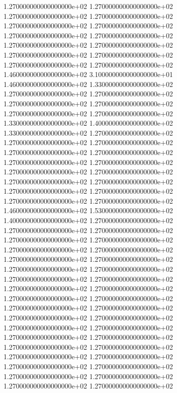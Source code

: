 1.270000000000000000e+02 1.270000000000000000e+02 1.270000000000000000e+02 1.270000000000000000e+02 1.270000000000000000e+02 1.270000000000000000e+02 1.270000000000000000e+02 1.270000000000000000e+02 1.270000000000000000e+02 1.270000000000000000e+02 1.270000000000000000e+02 1.270000000000000000e+02 1.270000000000000000e+02 1.270000000000000000e+02 1.460000000000000000e+02 3.100000000000000000e+01 1.460000000000000000e+02 1.330000000000000000e+02 1.270000000000000000e+02 1.270000000000000000e+02 1.270000000000000000e+02 1.270000000000000000e+02 1.270000000000000000e+02 1.270000000000000000e+02 1.330000000000000000e+02 1.400000000000000000e+02 1.330000000000000000e+02 1.270000000000000000e+02 1.270000000000000000e+02 1.270000000000000000e+02 1.270000000000000000e+02 1.270000000000000000e+02 1.270000000000000000e+02 1.270000000000000000e+02 1.270000000000000000e+02 1.270000000000000000e+02 1.270000000000000000e+02 1.270000000000000000e+02 1.270000000000000000e+02 1.270000000000000000e+02 1.270000000000000000e+02 1.270000000000000000e+02 1.460000000000000000e+02 1.530000000000000000e+02 1.400000000000000000e+02 1.270000000000000000e+02 1.270000000000000000e+02 1.270000000000000000e+02 1.270000000000000000e+02 1.270000000000000000e+02 1.270000000000000000e+02 1.270000000000000000e+02 1.270000000000000000e+02 1.270000000000000000e+02 1.270000000000000000e+02 1.270000000000000000e+02 1.270000000000000000e+02 1.270000000000000000e+02 1.270000000000000000e+02 1.270000000000000000e+02 1.270000000000000000e+02 1.270000000000000000e+02 1.270000000000000000e+02 1.270000000000000000e+02 1.270000000000000000e+02 1.270000000000000000e+02 1.270000000000000000e+02 1.270000000000000000e+02 1.270000000000000000e+02 1.270000000000000000e+02 1.270000000000000000e+02 1.270000000000000000e+02 1.270000000000000000e+02 1.270000000000000000e+02 1.270000000000000000e+02 1.270000000000000000e+02 1.270000000000000000e+02 1.270000000000000000e+02 1.270000000000000000e+02 1.270000000000000000e+02

